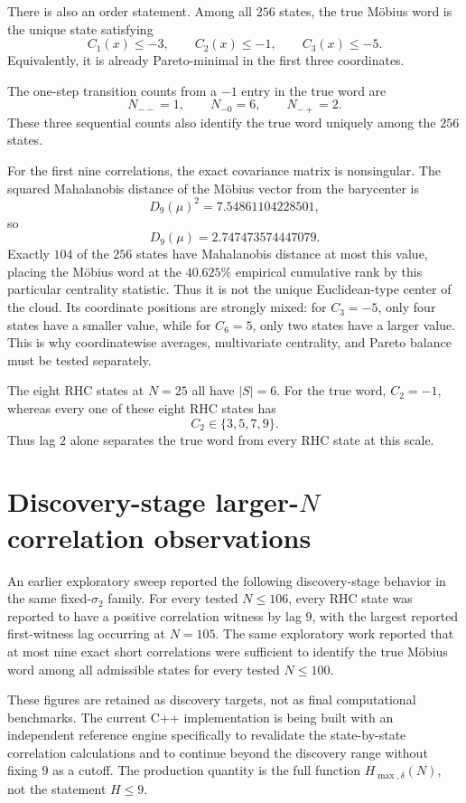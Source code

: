 \documentclass[11pt]{article}
\begin{document}
There is also an order statement. Among all $256$ states, the true Möbius word is the unique state satisfying
\[
 C_1(x)\le-3,\qquad
 C_2(x)\le-1,\qquad
 C_3(x)\le-5.
\]
Equivalently, it is already Pareto-minimal in the first three coordinates.

The one-step transition counts from a $-1$ entry in the true word are
\[
 N_{--}=1,
 \qquad
 N_{-0}=6,
 \qquad
 N_{-+}=2.
\]
These three sequential counts also identify the true word uniquely among the $256$ states.

For the first nine correlations, the exact covariance matrix is nonsingular. The squared Mahalanobis distance of the Möbius vector from the barycenter is
\[
 D_9(\mu)^2=7.54861104228501,
\]
so
\[
 D_9(\mu)=2.747473574447079.
\]
Exactly $104$ of the $256$ states have Mahalanobis distance at most this value, placing the Möbius word at the $40.625\%$ empirical cumulative rank by this particular centrality statistic. Thus it is not the unique Euclidean-type center of the cloud. Its coordinate positions are strongly mixed: for $C_3=-5$, only four states have a smaller value, while for $C_6=5$, only two states have a larger value. This is why coordinatewise averages, multivariate centrality, and Pareto balance must be tested separately.

The eight RHC states at $N=25$ all have $|S|=6$. For the true word, $C_2=-1$, whereas every one of these eight RHC states has
\[
 C_2\in\{3,5,7,9\}.
\]
Thus lag $2$ alone separates the true word from every RHC state at this scale.

\section{Discovery-stage larger-$N$ correlation observations}
An earlier exploratory sweep reported the following discovery-stage behavior in the same fixed-$\sigma_2$ family. For every tested $N\le106$, every RHC state was reported to have a positive correlation witness by lag $9$, with the largest reported first-witness lag occurring at $N=105$. The same exploratory work reported that at most nine exact short correlations were sufficient to identify the true Möbius word among all admissible states for every tested $N\le100$.

These figures are retained as discovery targets, not as final computational benchmarks. The current C++ implementation is being built with an independent reference engine specifically to revalidate the state-by-state correlation calculations and to continue beyond the discovery range without fixing $9$ as a cutoff. The production quantity is the full function $H_{\max,\delta}(N)$, not the statement $H\le9$.
\end{document}
